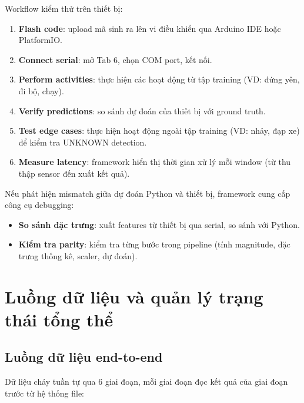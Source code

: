 Workflow kiểm thử trên thiết bị:
\begin{enumerate}
    \item \textbf{Flash code}: upload mã sinh ra lên vi điều khiển qua Arduino IDE hoặc PlatformIO.
    \item \textbf{Connect serial}: mở Tab 6, chọn COM port, kết nối.
    \item \textbf{Perform activities}: thực hiện các hoạt động từ tập training (VD: đứng yên, đi bộ, chạy).
    \item \textbf{Verify predictions}: so sánh dự đoán của thiết bị với ground truth.
    \item \textbf{Test edge cases}: thực hiện hoạt động ngoài tập training (VD: nhảy, đạp xe) để kiểm tra UNKNOWN detection.
    \item \textbf{Measure latency}: framework hiển thị thời gian xử lý mỗi window (từ thu thập sensor đến xuất kết quả).
\end{enumerate}

Nếu phát hiện mismatch giữa dự đoán Python và thiết bị, framework cung cấp công cụ debugging:
\begin{itemize}
    \item \textbf{So sánh đặc trưng}: xuất features từ thiết bị qua serial, so sánh với Python.
    \item \textbf{Kiểm tra parity}: kiểm tra từng bước trong pipeline (tính magnitude, đặc trưng thống kê, scaler, dự đoán).
\end{itemize}

\section{Luồng dữ liệu và quản lý trạng thái tổng thể}
\label{sec:dataflow_state_management}

\subsection{Luồng dữ liệu end-to-end}
\label{subsec:end_to_end_dataflow}

Dữ liệu chảy tuần tự qua 6 giai đoạn, mỗi giai đoạn đọc kết quả của giai đoạn trước từ hệ thống file:

